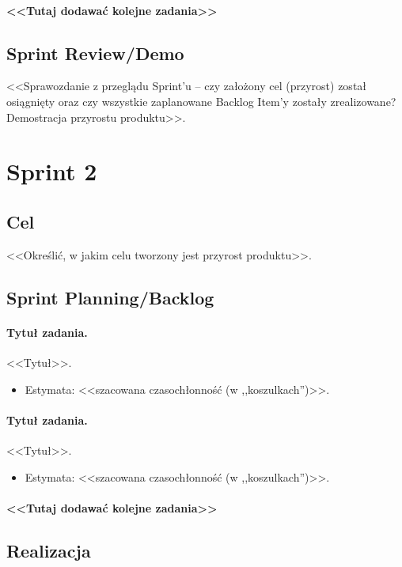 \documentclass[a4paper]{article}
\begin{document}
\paragraph{<<Tutaj dodawać kolejne zadania>>}


\subsection{Sprint Review/Demo}
<<Sprawozdanie z przeglądu Sprint'u -- czy założony cel (przyrost) został osiągnięty oraz czy wszystkie zaplanowane Backlog Item'y zostały zrealizowane? Demostracja przyrostu produktu>>.

\section{Sprint 2}

\subsection{Cel} <<Określić, w jakim celu tworzony jest przyrost produktu>>.

\subsection{Sprint Planning/Backlog}

\paragraph{Tytuł zadania.} <<Tytuł>>.
\begin{itemize}
\item Estymata: <<szacowana czasochłonność (w ,,koszulkach'')>>.
\end{itemize}

\paragraph{Tytuł zadania.} <<Tytuł>>.
\begin{itemize}
\item Estymata: <<szacowana czasochłonność (w ,,koszulkach'')>>.
\end{itemize}

\paragraph{<<Tutaj dodawać kolejne zadania>>}

\subsection{Realizacja}
\end{document}
